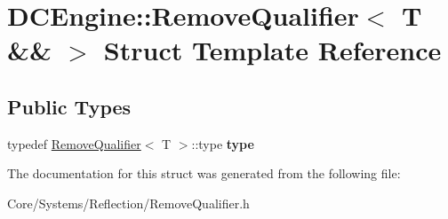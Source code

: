 \hypertarget{structDCEngine_1_1RemoveQualifier_3_01T_01_6_6_01_4}{\section{D\-C\-Engine\-:\-:Remove\-Qualifier$<$ T \&\& $>$ Struct Template Reference}
\label{structDCEngine_1_1RemoveQualifier_3_01T_01_6_6_01_4}
}
\subsection*{Public Types}
\begin{DoxyCompactItemize}
\item 
\hypertarget{structDCEngine_1_1RemoveQualifier_3_01T_01_6_6_01_4_ab98b78de5359215432cd7d9d871d8814}{typedef \hyperlink{structDCEngine_1_1RemoveQualifier}{Remove\-Qualifier}$<$ T $>$\-::type {\bfseries type}}\label{structDCEngine_1_1RemoveQualifier_3_01T_01_6_6_01_4_ab98b78de5359215432cd7d9d871d8814}

\end{DoxyCompactItemize}


The documentation for this struct was generated from the following file\-:\begin{DoxyCompactItemize}
\item 
Core/\-Systems/\-Reflection/Remove\-Qualifier.\-h\end{DoxyCompactItemize}
